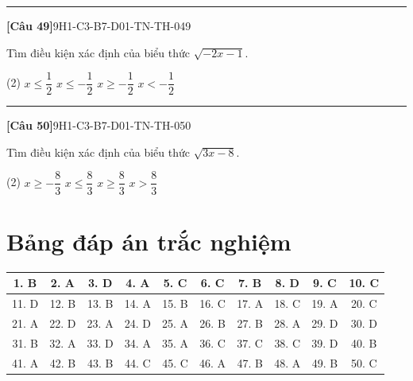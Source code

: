 \documentclass[12pt,a4paper]{article}
\newif\ifloigiai
\newenvironment{cauhoi}[2]{%
  \par\medskip\noindent\rule{\textwidth}{0.4pt}\par\nopagebreak
  \noindent\textbf{[#1]}\hfill{\scriptsize\ttfamily #2}\par\nopagebreak\smallskip}{\par}
\newcommand{\dapan}[1]{\ifloigiai\par\smallskip\noindent\textit{Đáp án:} \textbf{#1}\par\fi}
\begin{document}
\begin{cauhoi}{Câu 49}{9H1-C3-B7-D01-TN-TH-049}
Tìm điều kiện xác định của biểu thức $\sqrt{-2x - 1}$.
\begin{tasks}(2)
\task $x\le \dfrac{1}{2}$
\task $x\le -\dfrac{1}{2}$
\task $x\ge -\dfrac{1}{2}$
\task $x<-\dfrac{1}{2}$
\end{tasks}
\dapan{B}
\end{cauhoi}
\begin{cauhoi}{Câu 50}{9H1-C3-B7-D01-TN-TH-050}
Tìm điều kiện xác định của biểu thức $\sqrt{3x - 8}$.
\begin{tasks}(2)
\task $x\ge -\dfrac{8}{3}$
\task $x\le \dfrac{8}{3}$
\task $x\ge \dfrac{8}{3}$
\task $x>\dfrac{8}{3}$
\end{tasks}
\dapan{C}
\end{cauhoi}
\clearpage\section*{Bảng đáp án trắc nghiệm}
\begin{center}\begin{tabular}{|c|c|c|c|c|c|c|c|c|c|}
\hline
1. B & 2. A & 3. D & 4. A & 5. C & 6. C & 7. B & 8. D & 9. C & 10. C\\\hline
11. D & 12. B & 13. B & 14. A & 15. B & 16. C & 17. A & 18. C & 19. A & 20. C\\\hline
21. A & 22. D & 23. A & 24. D & 25. A & 26. B & 27. B & 28. A & 29. D & 30. D\\\hline
31. B & 32. A & 33. D & 34. A & 35. A & 36. C & 37. C & 38. C & 39. D & 40. B\\\hline
41. A & 42. B & 43. B & 44. C & 45. C & 46. A & 47. B & 48. A & 49. B & 50. C\\\hline
\end{tabular}\end{center}
\end{document}
